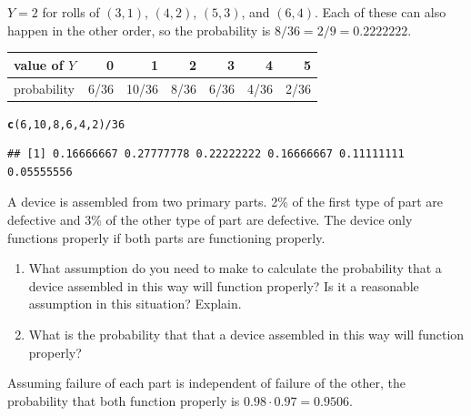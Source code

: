 \documentclass[twoside]{book}\usepackage[]{graphicx}\usepackage[]{xcolor}
\makeatletter
\newcommand{\hlnum}[1]{\textcolor[rgb]{0.686,0.059,0.569}{#1}}%
\newcommand{\hlopt}[1]{\textcolor[rgb]{0,0,0}{#1}}%
\newcommand{\hlstd}[1]{\textcolor[rgb]{0.345,0.345,0.345}{#1}}%
\newcommand{\hlkwd}[1]{\textcolor[rgb]{0.737,0.353,0.396}{\textbf{#1}}}%
\newenvironment{kframe}{%
 \def\at@end@of@kframe{}%
 \ifinner\ifhmode%
  \def\at@end@of@kframe{\end{minipage}}%
  \begin{minipage}{\columnwidth}%
 \fi\fi%
 \def\FrameCommand##1{\hskip\@totalleftmargin \hskip-\fboxsep
 \colorbox{shadecolor}{##1}\hskip-\fboxsep
     \hskip-\linewidth \hskip-\@totalleftmargin \hskip\columnwidth}%
 \MakeFramed {\advance\hsize-\width
   \@totalleftmargin\z@ \linewidth\hsize
   \@setminipage}}%
 {\par\unskip\endMakeFramed%
 \at@end@of@kframe}
\newenvironment{knitrout}{}{} %
\makeatother
\begin{document}
\begin{solution}
	$Y = 2$ for rolls of $(3,1)$, $(4,2)$, $(5,3)$, and $(6,4)$.  Each of these 
	can also happen in the other order, so the probability is $8/36 = 2/9 = 0.2222222$.

\begin{center}
	\begin{tabular}{lrrrrrr}
		\hline
		value of $Y$ & 0 & 1 & 2 & 3 & 4 & 5 \\
		\hline
		probability & 6/36 & 10/36 & 8/36 & 6/36 & 4/36 & 2/36 \\
		\hline
	\end{tabular}
\end{center}
\begin{knitrout}
\color{fgcolor}\begin{kframe}
\begin{alltt}
\hlkwd{c}\hlstd{(}\hlnum{6}\hlstd{,} \hlnum{10}\hlstd{,} \hlnum{8}\hlstd{,} \hlnum{6}\hlstd{,} \hlnum{4}\hlstd{,} \hlnum{2}\hlstd{)}\hlopt{/}\hlnum{36}
\end{alltt}
\begin{verbatim}
## [1] 0.16666667 0.27777778 0.22222222 0.16666667 0.11111111 0.05555556
\end{verbatim}
\end{kframe}
\end{knitrout}
\end{solution}

\begin{problem}
	A device is assembled from two primary parts.  2\% of the first type of part
	are defective and 3\% of the other type of part are defective.  The device
	only functions properly if both parts are functioning properly.
	\begin{enumerate}
	\item
	What assumption do you need to make to calculate the probability
	that a device assembled in this way will function properly?
	Is it a reasonable assumption in this situation?  Explain.
	\item
	What is the probability that that a device assembled in this way will 
	function properly?
	\end{enumerate}
\end{problem}

\begin{solution}
	Assuming failure of each part is independent of failure of the other,
	the probability that both function properly is 
	$0.98 \cdot 0.97 = 0.9506$.
\end{solution}
\end{document}
